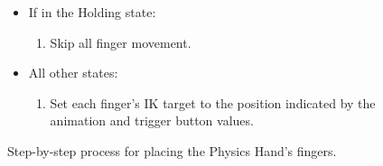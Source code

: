 \begin{figure}[H]
\begin{itemize}[noitemsep]
\begin{enumerate}[noitemsep]
\item Get the position that each finger would have according the the animation and trigger button value.
\item Find an intermediate position for the fingers slerping\footnote{SOMETHING ABOUT SLERPING HERE!} from the saved IK target position towards the animation position.
\item Set the IK target of the finger to the intermediate position found for it.
\end{enumerate}
\item If in the Holding state:
\begin{enumerate}[noitemsep]
\item Skip all finger movement.
\end{enumerate}
\item All other states:
\begin{enumerate}[noitemsep]
\item Set each finger's IK target to the position indicated by the animation and trigger button values.
\end{enumerate}
\end{itemize}
\caption{Step-by-step process for placing the Physics Hand's fingers.}
\label{fig:stepByStepPhysicsHandFingers}
\end{figure}

